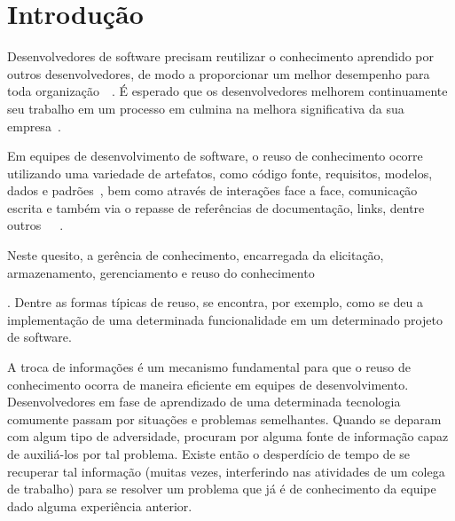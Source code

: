 \chapter{Introdução}


Desenvolvedores de software precisam reutilizar o conhecimento aprendido por outros desenvolvedores, de modo a proporcionar um melhor desempenho para toda organização~\cite{Druker1993}~\cite{Wiig2003}.
É esperado que os desenvolvedores melhorem continuamente seu trabalho em um processo em culmina na melhora significativa da sua empresa~\cite{Kavitha2011}.

Em equipes de desenvolvimento de software, o reuso de conhecimento ocorre utilizando uma variedade de artefatos, como código fonte, requisitos, modelos, dados e padrões~\cite{Levy2009}, bem como através de interações face a face, comunicação escrita e também via o repasse de referências de documentação, links, dentre outros~\cite{Storey2014}~\cite{Olson2000}~\cite{CubraniC2004}.

Neste quesito, a gerência de conhecimento, encarregada da elicitação, armazenamento, gerenciamento e reuso do conhecimento .
Dentre as formas típicas de reuso, se encontra, por exemplo, como se deu a implementação de uma determinada funcionalidade em um determinado projeto de software.




A troca de informações é um mecanismo fundamental para que o reuso de conhecimento ocorra de maneira eficiente em equipes de desenvolvimento. Desenvolvedores em fase de aprendizado de uma determinada tecnologia comumente passam por situações e problemas semelhantes. Quando se deparam com algum tipo de adversidade, procuram por alguma fonte de informação capaz de auxiliá-los por tal problema. Existe então o desperdício de tempo de se recuperar tal informação (muitas vezes, interferindo nas atividades de um colega de trabalho) para se resolver um problema que já é de conhecimento da equipe dado alguma experiência anterior.

